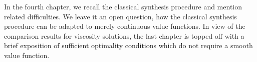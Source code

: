 In the fourth chapter, we recall the classical synthesis procedure and mention related difficulties. We leave it an open question, how the classical synthesis procedure can be adapted to merely continuous value functions. In view of the comparison results for viscosity solutions, the last chapter is topped off with a brief exposition of sufficient optimality conditions which do not require a smooth value function.






